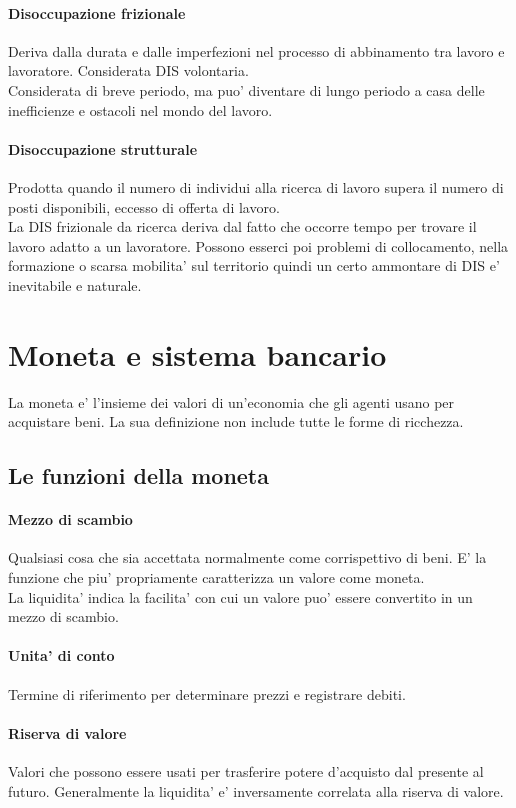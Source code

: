 \documentclass{report}
\begin{document}
	\paragraph{Disoccupazione frizionale} Deriva dalla durata e dalle imperfezioni nel processo di abbinamento tra lavoro e lavoratore. Considerata DIS volontaria.
	\medskip \\Considerata di breve periodo, ma puo' diventare di lungo periodo a casa delle inefficienze e ostacoli nel mondo del lavoro.
	\paragraph{Disoccupazione strutturale} Prodotta quando il numero di individui alla ricerca di lavoro supera il numero di posti disponibili, eccesso di offerta di lavoro.
	\medskip \\La DIS frizionale da ricerca deriva dal fatto che occorre tempo per trovare il lavoro adatto a un lavoratore. Possono esserci poi problemi di collocamento, nella formazione o scarsa mobilita' sul territorio quindi un certo ammontare di DIS e' inevitabile e naturale.
	\section{Moneta e sistema bancario}
	La moneta e' l'insieme dei valori di un'economia che gli agenti usano per acquistare beni. La sua definizione non include tutte le forme di ricchezza.
	\subsection{Le funzioni della moneta}
	\paragraph{Mezzo di scambio} Qualsiasi cosa che sia accettata normalmente come corrispettivo di beni. E' la funzione che piu' propriamente caratterizza un valore come moneta.
	\medskip \\La liquidita' indica la facilita' con cui un valore puo' essere convertito in un mezzo di scambio.
	\paragraph{Unita' di conto} Termine di riferimento per determinare prezzi e registrare debiti.
	\paragraph{Riserva di valore} Valori che possono essere usati per trasferire potere d'acquisto dal presente al futuro. Generalmente la liquidita' e' inversamente correlata alla riserva di valore.
\end{document}
